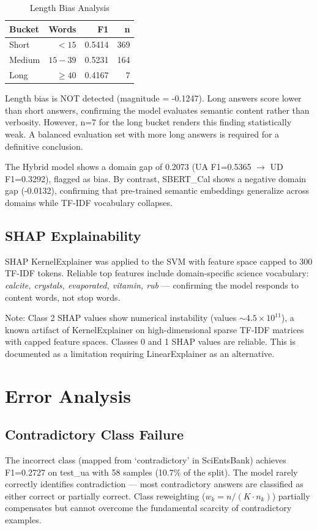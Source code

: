 \documentclass[conference]{IEEEtran}
\begin{document}
\begin{table}[ht]
\centering
\caption{Length Bias Analysis}
\begin{tabular}{lrrr}
\toprule
\textbf{Bucket} & \textbf{Words} & \textbf{F1} & \textbf{n} \\
\midrule
Short & $<15$ & 0.5414 & 369 \\
Medium & $15-39$ & 0.5231 & 164 \\
Long & $\geq40$ & 0.4167 & 7 \\
\bottomrule
\end{tabular}
\end{table}

Length bias is NOT detected (magnitude = -0.1247). Long answers score lower than short answers, confirming the model evaluates semantic content rather than verbosity. However, n=7 for the long bucket renders this finding statistically weak. A balanced evaluation set with more long answers is required for a definitive conclusion.

The Hybrid model shows a domain gap of 0.2073 (UA F1=0.5365 $\to$ UD F1=0.3292), flagged as bias. By contrast, SBERT\_Cal shows a negative domain gap (-0.0132), confirming that pre-trained semantic embeddings generalize across domains while TF-IDF vocabulary collapses.

\subsection{SHAP Explainability}
SHAP KernelExplainer \cite{lundberg2017unified} was applied to the SVM with feature space capped to 300 TF-IDF tokens. Reliable top features include domain-specific science vocabulary: \textit{calcite, crystals, evaporated, vitamin, rub} — confirming the model responds to content words, not stop words.

Note: Class 2 SHAP values show numerical instability (values $\sim 4.5 \times 10^{11}$), a known artifact of KernelExplainer on high-dimensional sparse TF-IDF matrices with capped feature spaces. Classes 0 and 1 SHAP values are reliable. This is documented as a limitation requiring LinearExplainer as an alternative.

\section{Error Analysis}

\subsection{Contradictory Class Failure}
The incorrect class (mapped from `contradictory' in SciEntsBank) achieves F1=0.2727 on test\_ua with 58 samples (10.7\% of the split). The model rarely correctly identifies contradiction — most contradictory answers are classified as either correct or partially correct. Class reweighting ($w_k = n/(K \cdot n_k)$) partially compensates but cannot overcome the fundamental scarcity of contradictory examples.
\end{document}
